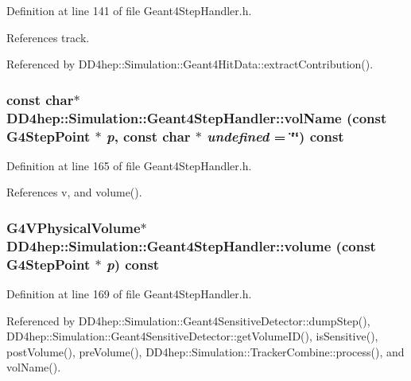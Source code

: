 Definition at line 141 of file Geant4StepHandler.h.

References track.

Referenced by DD4hep::Simulation::Geant4HitData::extractContribution().\hypertarget{class_d_d4hep_1_1_simulation_1_1_geant4_step_handler_afee3ff3d85321b5bf9a453d7c2ada632}{
\subsubsection[{volName}]{\setlength{\rightskip}{0pt plus 5cm}const char$\ast$ DD4hep::Simulation::Geant4StepHandler::volName (const G4StepPoint $\ast$ {\em p}, \/  const char $\ast$ {\em undefined} = {\ttfamily \char`\"{}\char`\"{}}) const}}
\label{class_d_d4hep_1_1_simulation_1_1_geant4_step_handler_afee3ff3d85321b5bf9a453d7c2ada632}


Definition at line 165 of file Geant4StepHandler.h.

References v, and volume().\hypertarget{class_d_d4hep_1_1_simulation_1_1_geant4_step_handler_a95ee141aadb5e72b9bd204b44ef62f0a}{
\subsubsection[{volume}]{\setlength{\rightskip}{0pt plus 5cm}G4VPhysicalVolume$\ast$ DD4hep::Simulation::Geant4StepHandler::volume (const G4StepPoint $\ast$ {\em p}) const}}
\label{class_d_d4hep_1_1_simulation_1_1_geant4_step_handler_a95ee141aadb5e72b9bd204b44ef62f0a}


Definition at line 169 of file Geant4StepHandler.h.

Referenced by DD4hep::Simulation::Geant4SensitiveDetector::dumpStep(), DD4hep::Simulation::Geant4SensitiveDetector::getVolumeID(), isSensitive(), postVolume(), preVolume(), DD4hep::Simulation::TrackerCombine::process(), and volName().

